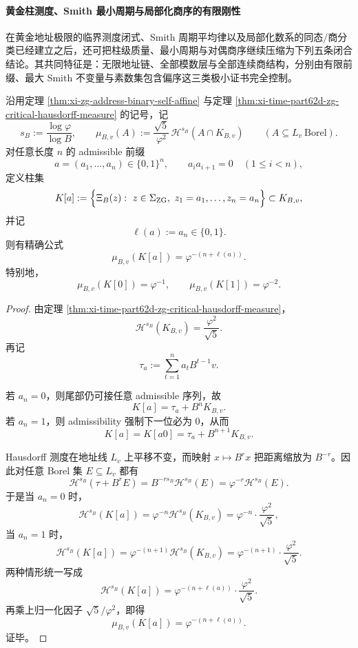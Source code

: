 \paragraph{黄金柱测度、Smith 最小周期与局部化商序的有限刚性}
在黄金地址极限的临界测度闭式、Smith 周期平均律以及局部化数系的同态/商分类已经建立之后，还可把柱级质量、最小周期与对偶商序继续压缩为下列五条闭合结论。其共同特征是：无限地址链、全部模数层与全部连续商结构，分别由有限前缀、最大 Smith 不变量与素数集包含偏序这三类极小证书完全控制。

\begin{conclusion}\label{con:xi-time-part62da-zg-cylinder-hausdorff-probability}
沿用定理 \ref{thm:xi-zg-address-binary-self-affine} 与定理
\ref{thm:xi-time-part62d-zg-critical-hausdorff-measure} 的记号，记
\[
s_B:=\frac{\log\varphi}{\log B},
\qquad
\mu_{B,v}(A):=
\frac{\sqrt5}{\varphi^2}\,\mathcal H^{s_B}(A\cap K_{B,v})
\qquad(A\subseteq L_v\ \text{Borel}).
\]
对任意长度 \(n\) 的 admissible 前缀
\[
a=(a_1,\dots,a_n)\in\{0,1\}^n,
\qquad
a_ia_{i+1}=0\quad(1\le i<n),
\]
定义柱集
\[
K[a]:=
\Bigl\{
\Xi_B(z):\ z\in \Sigma_{\mathrm{ZG}},\ z_1=a_1,\dots,z_n=a_n
\Bigr\}
\subset K_{B,v},
\]
并记
\[
\ell(a):=a_n\in\{0,1\}.
\]
则有精确公式
\[
\mu_{B,v}(K[a])=\varphi^{-(n+\ell(a))}.
\]
特别地，
\[
\mu_{B,v}(K[0])=\varphi^{-1},
\qquad
\mu_{B,v}(K[1])=\varphi^{-2}.
\]
\end{conclusion}
\begin{proof}
由定理 \ref{thm:xi-time-part62d-zg-critical-hausdorff-measure}，
\[
\mathcal H^{s_B}(K_{B,v})=\frac{\varphi^2}{\sqrt5}.
\]
再记
\[
\tau_a:=\sum_{t=1}^{n}a_tB^{t-1}v.
\]

若 \(a_n=0\)，则尾部仍可接任意 admissible 序列，故
\[
K[a]=\tau_a+B^nK_{B,v}.
\]
若 \(a_n=1\)，则 admissibility 强制下一位必为 \(0\)，从而
\[
K[a]=K[a0]=\tau_a+B^{n+1}K_{B,v}.
\]

Hausdorff 测度在地址线 \(L_v\) 上平移不变，而映射 \(x\mapsto B^r x\) 把距离缩放为 \(B^{-r}\)。因此对任意 Borel 集 \(E\subseteq L_v\) 都有
\[
\mathcal H^{s_B}(\tau+B^rE)
=
B^{-rs_B}\mathcal H^{s_B}(E)
=
\varphi^{-r}\mathcal H^{s_B}(E).
\]
于是当 \(a_n=0\) 时，
\[
\mathcal H^{s_B}(K[a])
=
\varphi^{-n}\mathcal H^{s_B}(K_{B,v})
=
\varphi^{-n}\cdot \frac{\varphi^2}{\sqrt5},
\]
当 \(a_n=1\) 时，
\[
\mathcal H^{s_B}(K[a])
=
\varphi^{-(n+1)}\mathcal H^{s_B}(K_{B,v})
=
\varphi^{-(n+1)}\cdot \frac{\varphi^2}{\sqrt5}.
\]
两种情形统一写成
\[
\mathcal H^{s_B}(K[a])
=
\varphi^{-(n+\ell(a))}\cdot \frac{\varphi^2}{\sqrt5}.
\]
再乘上归一化因子 \(\sqrt5/\varphi^2\)，即得
\[
\mu_{B,v}(K[a])=\varphi^{-(n+\ell(a))}.
\]
证毕。
\end{proof}

